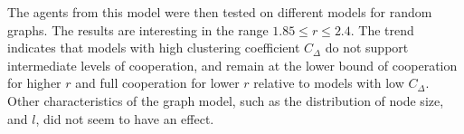 The agents from this model were then tested on different models for random graphs. The results are interesting in the range $1.85\leq r \leq 2.4$. The trend indicates that models with high clustering coefficient $C_\Delta$ do not support intermediate levels of cooperation, and remain at the lower bound of cooperation for higher $r$ and full cooperation for lower $r$ relative to models with low $C_\Delta$. Other characteristics of the graph model, such as the distribution of node size, and $l$, did not seem to have an effect. \\



